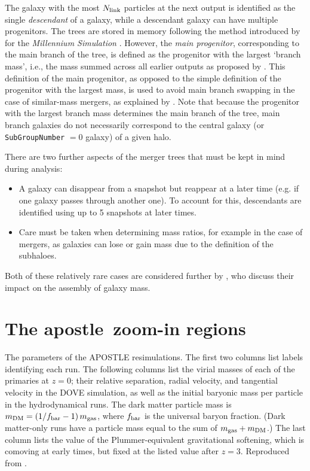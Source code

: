\documentclass[10pt, a4paper]{article}
\newcommand{\apostle}{{\sc apostle}}
\begin{document}
The galaxy with the most $N_{\rm link}$ particles at the next output is identified as the single \emph{descendant} of a galaxy, while a descendant galaxy can have multiple progenitors. The trees are stored in memory following the method introduced by \cite{2006ASPC..351..212L} for the \emph{Millennium Simulation} \citep[See also the supplementary material of][where the details of the tree ordering are summarized]{2005Natur.435..629S}. However, the \emph{main progenitor}, corresponding to the main branch of the tree, is defined as the progenitor with the largest `branch mass', i.e., the mass summed across all earlier outputs as proposed by \cite{2007MNRAS.375....2D}. This definition of the main progenitor, as opposed to the simple definition of the progenitor with the largest mass, is used to avoid main branch swapping in the case of similar-mass mergers, as explained by \citet{2017MNRAS.464.1659Q}. Note that because the progenitor with the largest branch mass determines the main branch of the tree, main branch galaxies do not necessarily correspond to the central galaxy (or \texttt{SubGroupNumber} $= 0$ galaxy) of a given halo.

There are two further aspects of the merger trees that must be kept in mind during analysis:
\begin{itemize}
\item A galaxy can disappear from a snapshot but reappear at a later time (e.g. if one galaxy passes through another one).  To account for this, descendants are identified using up to 5 snapshots at later times.
\item Care must be taken when determining mass ratios, for example in the case of mergers, as galaxies can lose or gain mass due to the definition of the subhaloes.
\end{itemize}

Both of these relatively rare cases are considered further by \citet{2017MNRAS.464.1659Q}, who discuss their impact on the assembly of galaxy mass.

\section{The \apostle\ zoom-in regions}

\begin{table}
\caption{The parameters of the {\small APOSTLE} resimulations. The first two columns list labels identifying each run. The following columns list the virial masses of each of the primaries at $z=0$; their relative separation, radial velocity, and tangential velocity in the {\small DOVE} simulation, as well as the initial baryonic mass per particle in the hydrodynamical runs. The dark matter particle mass is $m_{\rm DM}=(1/f_{\rm bar}-1) \, m_{\rm gas}$, where $f_{\rm bar}$ is the universal baryon fraction. (Dark matter-only runs have a particle mass equal to the sum of $m_{\rm gas}+m_{\rm DM}$.) The last column lists the value of the Plummer-equivalent gravitational softening, which is comoving at early times, but fixed at the listed value after $z=3$. Reproduced from \cite{2016MNRAS.457..844F}.}
\vspace{5pt}
\centering
\footnotesize

\label{TabLGSims}
\end{table}
\end{document}
